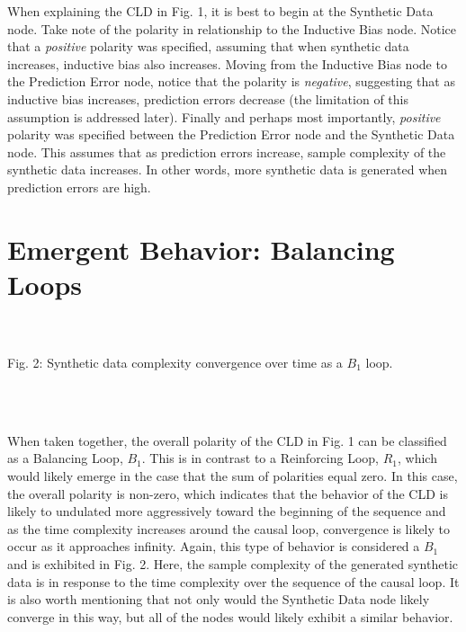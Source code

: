 \documentclass{article}
\begin{document}
\newpage
When explaining the CLD in Fig. 1, it is best to begin at the Synthetic Data node. Take note of the polarity in relationship to the Inductive Bias node. Notice that a \textit{positive} polarity was specified, assuming that when synthetic data increases, inductive bias also increases. Moving from the Inductive Bias node to the Prediction Error node, notice that the polarity is \textit{negative}, suggesting that as inductive bias increases, prediction errors decrease (the limitation of this assumption is addressed later). Finally and perhaps most importantly, \textit{positive} polarity was specified between the Prediction Error node and the Synthetic Data node. This assumes that as prediction errors increase, sample complexity of the synthetic data increases. In other words, more synthetic data is generated when prediction errors are high.

\section*{Emergent Behavior: Balancing Loops}
    \begin{center}
        \\~\\
        \caption{Fig. 2: Synthetic data complexity convergence over time as a $B_1$ loop.}
        \\~\\
    \end{center}

When taken together, the overall polarity of the CLD in Fig. 1 can be classified as a Balancing Loop, $B_1$. This is in contrast to a Reinforcing Loop, $R_1$, which would likely emerge in the case that the sum of polarities equal zero. In this case, the overall polarity is non-zero, which indicates that the behavior of the CLD is likely to undulated more aggressively toward the beginning of the sequence and as the time complexity increases around the causal loop, convergence is likely to occur as it approaches infinity. Again, this type of behavior is considered a $B_1$ and is exhibited in Fig. 2. Here, the sample complexity of the generated synthetic data is in response to the time complexity over the sequence of the causal loop. It is also worth mentioning that not only would the Synthetic Data node likely converge in this way, but all of the nodes would likely exhibit a similar behavior. \\
\end{document}
